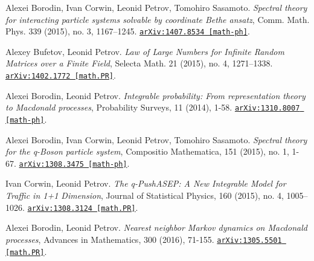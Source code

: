 \documentclass[letterpaper,11pt]{article}
\begin{document}
\begin{etaremune}
	
	
	
	
	
	
	
	
	
	
	
	
	\item 
	Alexei Borodin, Ivan Corwin, Leonid Petrov, Tomohiro Sasamoto.
	\emph{Spectral theory for interacting particle systems solvable by coordinate Bethe ansatz}, Comm. Math. Phys. 339 (2015), no. 3, 1167–1245. 
	\href{https://arxiv.org/abs/1407.8534}{\texttt{arXiv:1407.8534 [math-ph]}}.
	
	
	
	
	
	\item 
	Alexey Bufetov, Leonid Petrov.
	\emph{Law of Large Numbers for Infinite Random Matrices over a Finite Field}, Selecta Math. 21 (2015), no. 4, 1271–1338. 
	\href{https://arxiv.org/abs/1402.1772}{\texttt{arXiv:1402.1772 [math.PR]}}.
	
	
	
	
	
	
	
	
	
	
	
	
	
	\item 
	Alexei Borodin, Leonid Petrov.
	\emph{Integrable probability: From representation theory to Macdonald processes}, Probability Surveys, 11 (2014), 1-58. 
	\href{https://arxiv.org/abs/1310.8007}{\texttt{arXiv:1310.8007 [math-ph]}}.
	
	
	
	
	
	\item 
	Alexei Borodin, Ivan Corwin, Leonid Petrov, Tomohiro Sasamoto.
	\emph{Spectral theory for the q-Boson particle system}, Compositio Mathematica, 151 (2015), no. 1, 1-67. 
	\href{https://arxiv.org/abs/1308.3475}{\texttt{arXiv:1308.3475 [math-ph]}}.
	
	
	
	\item 
	Ivan Corwin, Leonid Petrov.
	\emph{The q-PushASEP: A New Integrable Model for Traffic in 1+1 Dimension}, Journal of Statistical Physics, 160 (2015), no. 4, 1005–1026. 
	\href{https://arxiv.org/abs/1308.3124}{\texttt{arXiv:1308.3124 [math.PR]}}.
	
	
	
	
	
	\item 
	Alexei Borodin, Leonid Petrov.
	\emph{Nearest neighbor Markov dynamics on Macdonald processes}, Advances in Mathematics, 300 (2016), 71-155. 
	\href{https://arxiv.org/abs/1305.5501}{\texttt{arXiv:1305.5501 [math.PR]}}.
	

\end{etaremune}
\end{document}
